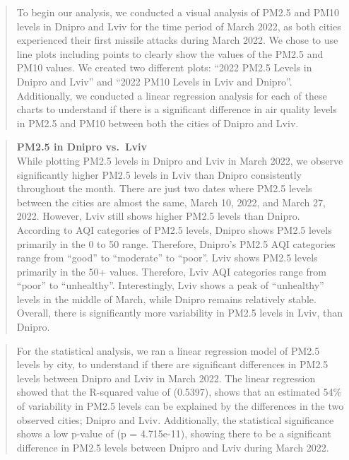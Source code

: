 \documentclass[
  12pt,
]{article}
\begin{document}
\begin{quote}
To begin our analysis, we conducted a visual analysis of PM2.5 and PM10
levels in Dnipro and Lviv for the time period of March 2022, as both
cities experienced their first missile attacks during March 2022. We
chose to use line plots including points to clearly show the values of
the PM2.5 and PM10 values. We created two different plots: ``2022 PM2.5
Levels in Dnipro and Lviv'' and ``2022 PM10 Levels in Lviv and Dnipro''.
Additionally, we conducted a linear regression analysis for each of
these charts to understand if there is a significant difference in air
quality levels in PM2.5 and PM10 between both the cities of Dnipro and
Lviv.
\end{quote}

\begin{quote}
\textbf{PM2.5 in Dnipro vs.~Lviv}\\
While plotting PM2.5 levels in Dnipro and Lviv in March 2022, we observe
significantly higher PM2.5 levels in Lviv than Dnipro consistently
throughout the month. There are just two dates where PM2.5 levels
between the cities are almost the same, March 10, 2022, and March 27,
2022. However, Lviv still shows higher PM2.5 levels than Dnipro.
According to AQI categories of PM2.5 levels, Dnipro shows PM2.5 levels
primarily in the 0 to 50 range. Therefore, Dnipro's PM2.5 AQI categories
range from ``good'' to ``moderate'' to ``poor''. Lviv shows PM2.5 levels
primarily in the 50+ values. Therefore, Lviv AQI categories range from
``poor'' to ``unhealthy''. Interestingly, Lviv shows a peak of
``unhealthy'' levels in the middle of March, while Dnipro remains
relatively stable. Overall, there is significantly more variability in
PM2.5 levels in Lviv, than Dnipro.
\end{quote}

\begin{quote}
For the statistical analysis, we ran a linear regression model of PM2.5
levels by city, to understand if there are significant differences in
PM2.5 levels between Dnipro and Lviv in March 2022. The linear
regression showed that the R-squared value of (0.5397), shows that an
estimated 54\% of variability in PM2.5 levels can be explained by the
differences in the two observed cities; Dnipro and Lviv. Additionally,
the statistical significance shows a low p-value of (p = 4.715e-11),
showing there to be a significant difference in PM2.5 levels between
Dnipro and Lviv during March 2022.
\end{quote}
\end{document}
